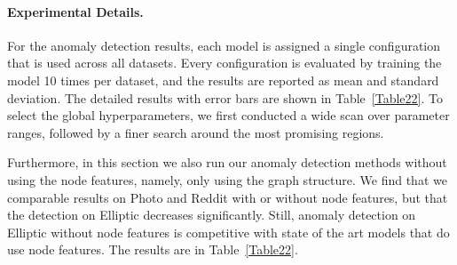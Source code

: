 \documentclass{article}
\theoremstyle{plain}
\theoremstyle{definition}
\theoremstyle{remark}
\newcommand{\ron}[1]{{{\textcolor{red}{\textbf{[Ron:} {#1}\textbf{]}}}}}
\begin{document}



\paragraph{Experimental Details.}
\label{sec: additional experiments anomaly}
For the anomaly detection results, each model is assigned a single configuration that is used across all datasets. Every configuration is evaluated by training the model 10 times per dataset, and the results are reported as mean and standard deviation. The detailed results with error bars are shown in Table~\ref{Table22}. To select the global hyperparameters, we first conducted a wide scan over parameter ranges, followed by a finer search around the most promising regions.


Furthermore, in this section we also run our anomaly detection methods without using the node features, namely, only using the graph structure. We find that we comparable results on Photo and Reddit with or without node features, but that the detection on Elliptic decreases significantly. Still, anomaly detection on Elliptic without node features is competitive with state of the art models that do use node features.  The results are in Table~\ref{Table22}.




\end{document}
